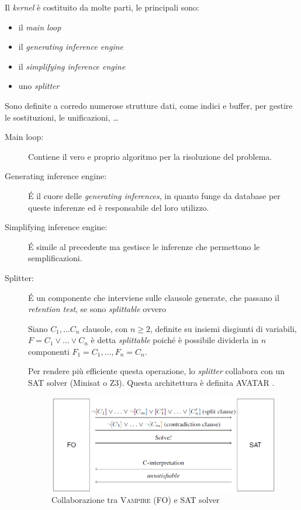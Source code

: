 Il \emph{kernel} è costituito da molte parti, le principali sono:
\begin{itemize}
    \item il \emph{main loop}
    \item il \emph{generating inference engine}
    \item il \emph{simplifying inference engine}
    \item uno \emph{splitter}
\end{itemize}
Sono definite a corredo numerose strutture dati, come indici e buffer, per gestire le sostituzioni, le unificazioni, \dots
\begin{description}
    \item[Main loop:] Contiene il vero e proprio algoritmo per la risoluzione del problema.
    \item[Generating inference engine:] \'E il cuore delle \emph{generating inferences}, in quanto funge da database per queste inferenze ed è responsabile del 
    loro utilizzo.
    \item[Simplifying inference engine:] \'E simile al precedente ma gestisce le inferenze che permettono le semplificazioni.
    \item[Splitter:] \'E un componente che interviene sulle clausole generate, che passano il \emph{retention test}, se sono \emph{splittable} ovvero
    \begin{definition}
        Siano $C_1,\dots C_n$ clausole, con $n\geq 2$, definite su insiemi disgiunti di variabili, 
        $F=C_1 \lor \dots \lor C_n$ è detta \emph{splittable} poiché è possibile dividerla in $n$ componenti $F_1=C_1, \dots, F_n=C_n$.
    \end{definition}
    Per rendere più efficiente questa operazione, lo \emph{splitter} collabora con un SAT solver (Minisat o Z3). Questa architettura è definita AVATAR \cite{voronkov2014avatar}. 
    \begin{figure}[H]
        \centering
        \includegraphics[width=\columnwidth]{figures/avatar.png}
        \caption{Collaborazione tra \textsc{Vampire} (FO) e SAT solver \cite{voronkov2014avatar}}
    \end{figure}
\end{description}

